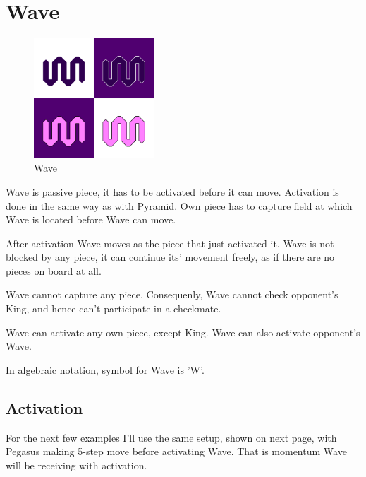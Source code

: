 \documentclass[a5paper,12pt,draft]{book} %
\begin{document}
\clearpage

\section*{Wave}

\noindent
\begin{figure}
\includegraphics[width=0.4\textwidth, keepaspectratio=true]{../gfx/pieces/10_wave.png}
\caption{Wave}
\label{fig:wave}
\end{figure}
Wave is passive piece, it has to be activated before it can move.
Activation is done in the same way as with Pyramid. Own piece
has to capture field at which Wave is located before Wave can
move.

After activation Wave moves as the piece that just activated it.
Wave is not blocked by any piece, it can continue its' movement
freely, as if there are no pieces on board at all.

Wave cannot capture any piece. Consequenly, Wave cannot check
opponent's King, and hence can't participate in a checkmate.

Wave can activate any own piece, except King. Wave can also
activate opponent's Wave.

In algebraic notation, symbol for Wave is 'W'.

\subsection*{Activation}

For the next few examples I'll use the same setup, shown on next
page, with Pegasus making 5-step move before activating Wave. That
is momentum Wave will be receiving with activation.

\clearpage
\end{document}
